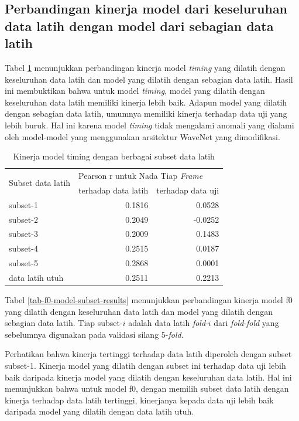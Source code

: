 \subsection{Perbandingan kinerja model dari keseluruhan data latih dengan model dari sebagian data latih}

Tabel \ref{tab-timing-model-subset-results} menunjukkan perbandingan kinerja model \textit{timing} yang dilatih dengan keseluruhan data latih dan model yang dilatih dengan sebagian data latih. Hasil ini membuktikan bahwa untuk model \textit{timing}, model yang dilatih dengan keseluruhan data latih memiliki kinerja lebih baik. Adapun model yang dilatih dengan sebagian data latih, umumnya memiliki kinerja terhadap data uji yang lebih buruk. Hal ini karena model \textit{timing} tidak mengalami anomali yang dialami oleh model-model yang menggunakan arsitektur WaveNet yang dimodifikasi.

\begin{table}[htbp]
    \centering
    \caption{Kinerja model timing dengan berbagai subset data latih}\label{tab-timing-model-subset-results}
    \begin{tabular}{ |l|r|r| } 
     \hline
     \multirow{2}{*}{Subset data latih} & \multicolumn{2}{l|}{Pearson r untuk Nada Tiap \textit{Frame}} \\
     \cline{2-3}
     & terhadap data latih & terhadap data uji \\\hline

	subset-1          &0.1816  &0.0528\\\hline
	subset-2          &0.2049 &-0.0252\\\hline
	subset-3          &0.2009  &0.1483\\\hline
	subset-4          &0.2515  &0.0187\\\hline
	subset-5          &0.2868  &0.0001\\\hline
	data latih utuh			 &0.2511  &0.2213\\\hline
    \end{tabular}
\end{table}

Tabel \ref{tab-f0-model-subset-results} menunjukkan perbandingan kinerja model f0 yang dilatih dengan keseluruhan data latih dan model yang dilatih dengan sebagian data latih. Tiap subset-$i$ adalah data latih \textit{fold}-$i$ dari \textit{fold}-\textit{fold} yang sebelumnya digunakan pada validasi silang $5$-\textit{fold}.

Perhatikan bahwa kinerja tertinggi terhadap data latih diperoleh dengan subset subset-1. Kinerja model yang dilatih dengan subset ini terhadap data uji lebih baik daripada kinerja model yang dilatih dengan keseluruhan data latih. Hal ini menunjukkan bahwa untuk model f0, dengan memilih subset data latih dengan kinerja terhadap data latih tertinggi, kinerjanya kepada data uji lebih baik daripada model yang dilatih dengan data latih utuh. 

